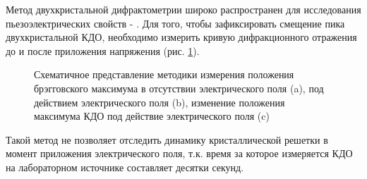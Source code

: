 Метод двухкристальной дифрактометрии широко распространен для исследования пьезоэлектрических свойств \cite{piezo51} - \cite{piezo54}.
Для того, чтобы зафиксировать смещение пика двухкристальной КДО, необходимо измерить кривую дифракционного отражения
до и после приложения напряжения (рис. \ref{ris:piezo_classic}).
\begin{figure}[H]
  \centering
  \hfill
  \hfill

  \caption{Схематичное представление методики измерения положения брэгговского максимума
   в отсутствии электрического поля (a), под действием электрического поля (b),
   изменение положения максимума КДО под действие электрического поля (c)}
  \label{ris:piezo_classic}
\end{figure}
  Такой метод не позволяет отследить динамику кристаллической решетки в момент приложения электрического поля,
  т.к. время за которое измеряется КДО на лабораторном источнике составляет десятки секунд.
